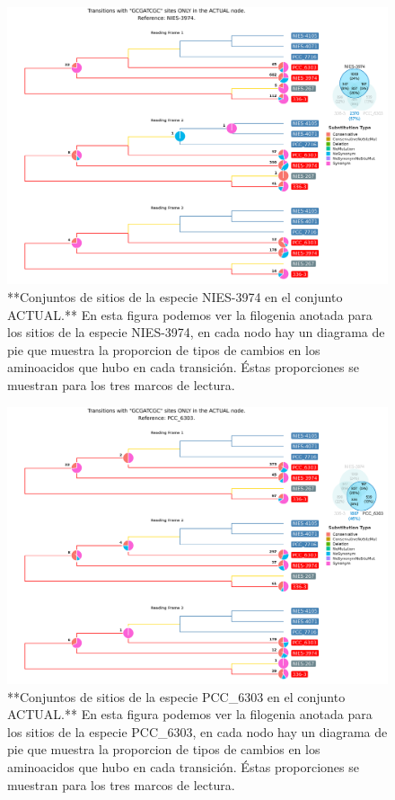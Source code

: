 \documentclass[
]{book}
\begin{document}
\begin{figure}

{\centering \includegraphics[width=1.2\linewidth]{Clados/Calothrix_B/figures/A/GCGATCGC/Actual/NIES-3974_Actual_A_tree} 

}

\caption{**Conjuntos de sitios de la especie NIES-3974 en el conjunto ACTUAL.** En esta figura podemos ver la filogenia anotada para los sitios de la especie NIES-3974, en cada nodo hay un diagrama de pie que muestra la proporcion de tipos de cambios en los aminoacidos que hubo en cada transición. Éstas proporciones se muestran para los tres marcos de lectura.}\label{fig:FIG10x}
\end{figure}

\begin{figure}

{\centering \includegraphics[width=1.2\linewidth]{Clados/Calothrix_B/figures/A/GCGATCGC/Actual/PCC_6303_Actual_A_tree} 

}

\caption{**Conjuntos de sitios de la especie PCC\_6303 en el conjunto ACTUAL.** En esta figura podemos ver la filogenia anotada para los sitios de la especie PCC\_6303, en cada nodo hay un diagrama de pie que muestra la proporcion de tipos de cambios en los aminoacidos que hubo en cada transición. Éstas proporciones se muestran para los tres marcos de lectura.}\label{fig:FIG11x}
\end{figure}
\end{document}
